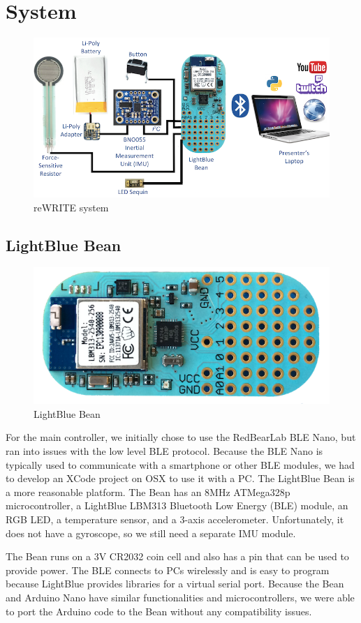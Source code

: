 \documentclass[10pt,journal]{IEEEtran}
\begin{document}
\section{System}

\begin{figure}[H]
  \centering
    \includegraphics[width=\linewidth]{figures/system}
  \caption{reWRITE system}
  \label{fig:system}
\end{figure}

\subsection{LightBlue Bean}

\begin{figure}[H]
  \centering
    \includegraphics[width=0.8\linewidth]{figures/bean}
  \caption{LightBlue Bean}
  \label{fig:bean}
\end{figure}

For the main controller, we initially chose to use the RedBearLab BLE Nano, but ran into issues with the low level BLE protocol. Because the BLE Nano is typically used to communicate with a smartphone or other BLE modules, we had to develop an XCode project on OSX to use it with a PC.
The LightBlue Bean is a more reasonable platform. The Bean has an 8MHz ATMega328p microcontroller, a LightBlue LBM313 Bluetooth Low Energy (BLE) module, an RGB LED, a temperature sensor, and a 3-axis accelerometer. Unfortunately, it does not have a gyroscope, so we still need a separate IMU module. 
\par The Bean runs on a 3V CR2032 coin cell and also has a pin that can be used to provide power. The BLE connects to PCs wirelessly and is easy to program because LightBlue provides libraries for a virtual serial port. Because the Bean and Arduino Nano have similar functionalities and microcontrollers, we were able to port the Arduino code to the Bean without any compatibility issues.
\end{document}
